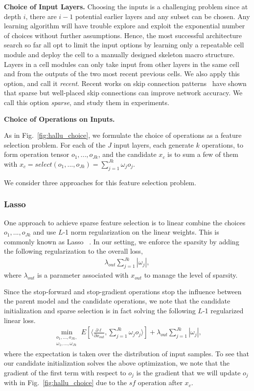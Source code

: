 \documentclass{article}
\begin{document}
\textbf{Choice of Input Layers.} 
Choosing the inputs is a challenging problem since at depth $i$, there are $i-1$ potential earlier layers and any subset can be chosen. Any learning algorithm will have trouble explore and exploit the exponential number of choices without further assumptions. Hence, the most successful architecture search so far all opt to limit the input options by learning only a repeatable cell module and deploy the cell to a manually designed skeleton macro structure. Layers in a cell modules can only take input from other layers in the same cell and from the outputs of the two most recent previous cells. We also apply this option, and call it \textit{recent}. 
Recent works on skip connection patterns~\citep{logdense, sparsenet} have shown that sparse but well-placed skip connections can improve network accuracy. We call this option \textit{sparse}, and study them in experiments.

\textbf{Choice of Operations on Inputs.}

As in Fig.~\ref{fig:hallu_choice}, we formulate the choice of operations as a feature selection problem. For each of the $J$ input layers, each generate $k$ operations, to form
operation tensor $o_1,...,o_{Jk}$, and the candidate $x_c$ is to sum a few of them with $x_c = select(o_1,..., o_{Jk}) = \sum _{j = 1}^{Jk} \omega_j o_j$. 

We consider three approaches for this feature selection problem.

\subsubsection{Lasso} 
One approach to achieve sparse feature selection is to linear combine the choices $o_1,...,o_{Jk}$ and use $L$-1 norm regularization on the linear weights. This is commonly known as Lasso
~\citep{lasso}. In our setting, we enforce the sparsity by adding the following regularization to the overall loss,
\begin{align}
    \lambda_{out} \sum _{j = 1}^{Jk} | \omega_j |,
\end{align}
where $\lambda_{out}$ is a parameter associated with $x_{out}$ to manage the level of sparsity. 

Since the stop-forward and stop-gradient operations stop the influence between the parent model and the candidate operations, we note that the candidate initialization and sparse selection is in fact solving the following $L$-1 regularized linear loss. 
\begin{align}
\label{eq:linear_lasso}
\min _{
    \substack{o_1,...,o_{Jk}, \\ \omega_1,..., \omega_{Jk}}
    } 
    E [\langle 
        \frac{\partial \ell}{\partial x_{out}} , 
        \sum _{j = 1}^{Jk} \omega_j o_j
    \rangle ] 
    + \lambda_{out} \sum _{j = 1}^{Jk} | \omega_j |,
\end{align}
where the expectation is taken over the distribution of input samples. 
To see that our candidate initialization solves the above optimization, we note that the gradient of the first term with respect to $o_j$ is the gradient that we will update $o_j$ with in Fig.~\ref{fig:hallu_choice} due to the $sf$ operation after $x_c$. 
\end{document}
